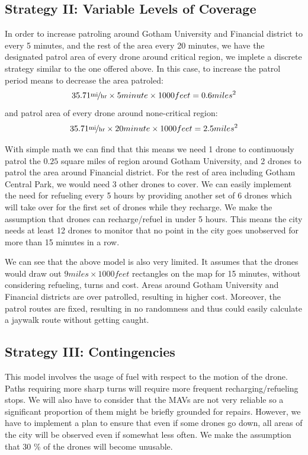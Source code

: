 \documentclass{article}
\begin{document}
\newpage 
\subsection{Strategy II: Variable Levels of Coverage}

In order to increase patroling around Gotham University and Financial district to every 5 minutes, and the rest of the area every 20 minutes, we have the designated patrol area of every drone around critical region, we implete a discrete strategy similar to the one offered above. In this case, to increase the patrol period means to decrease the area patroled:
\begin{equation}
35.71 \unitfrac{mi}{hr} \times 5 minute \times 1000 feet = 0.6 miles^2
\end{equation}
and patrol area of every drone around none-critical region:
\begin{equation}
35.71 \unitfrac{mi}{hr} \times 20 minute \times 1000 feet = 2.5 miles^2
\end{equation}

With simple math we can find that this means we need 1 drone to continuously patrol the $0.25$ square miles of region around Gotham University, and 2 drones to patrol the area around Financial district. For the rest of area including Gotham Central Park, we would need 3 other drones to cover. We can easily implement the need for refueling every 5 hours by providing another set of 6 drones which will take over for the first set of drones while they recharge. We make the assumption that drones can recharge/refuel in under 5 hours. This means the city needs at least 12 drones to monitor that no point in the city goes unobserved for more than 15 minutes in a row. 

We can see that the above model is also very limited. It assumes that the drones would draw out $9 miles \times 1000 feet $ rectangles on the map for 15 minutes, without considering refueling, turns and cost. Areas around Gotham University and Financial districts are over patrolled, resulting in higher cost. Moreover, the patrol routes are fixed, resulting in no randomness and thus could easily calculate a jaywalk route without getting caught. 

\newpage

\subsection{Strategy III: Contingencies}

This model involves the usage of fuel with respect to the motion of the drone. Paths requiring more sharp turns will require more frequent recharging/refueling stops. We will also have to consider that the MAVs are not very reliable so a significant proportion of them might be briefly grounded for repairs. However, we have to implement a plan to ensure that even if some drones go down, all areas of the city will be observed even if somewhat less often. We make the assumption that 30 \% of the drones will become unusable. 
\end{document}
